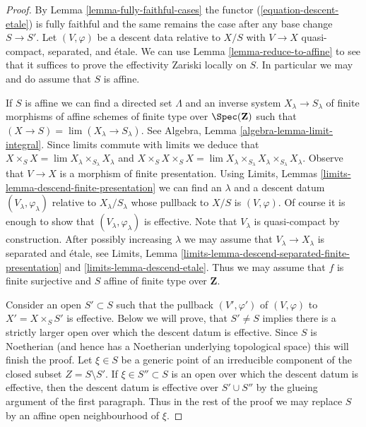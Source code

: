\begin{proof}
By Lemma \ref{lemma-fully-faithful-cases} the
functor (\ref{equation-descent-etale})
is fully faithful and the same remains the case after any
base change $S \to S'$. Let $(V, \varphi)$ be a descent data
relative to $X/S$ with $V \to X$ quasi-compact, separated, and \'etale.
We can use Lemma \ref{lemma-reduce-to-affine}
to see that it suffices to prove the effectivity 
Zariski locally on $S$. In particular we may and do
assume that $S$ is affine.

\medskip\noindent
If $S$ is affine we can find a directed set $\Lambda$ and
an inverse system $X_\lambda \to S_\lambda$
of finite morphisms of affine schemes of finite type over
$\Spec(\mathbf{Z})$ such that $(X \to S) = \lim (X_\lambda \to S_\lambda)$.
See Algebra, Lemma \ref{algebra-lemma-limit-integral}.
Since limits commute with limits we deduce that
$X \times_S X = \lim X_\lambda \times_{S_\lambda} X_\lambda$
and 
$X \times_S X \times_S X = \lim
X_\lambda \times_{S_\lambda} X_\lambda \times_{S_\lambda} X_\lambda$.
Observe that $V \to X$ is a morphism of finite presentation.
Using Limits, Lemmas \ref{limits-lemma-descend-finite-presentation}
we can find an $\lambda$ and a descent datum $(V_\lambda, \varphi_\lambda)$
relative to $X_\lambda/S_\lambda$ whose pullback to $X/S$ is
$(V, \varphi)$. Of course it is enough to show that
$(V_\lambda, \varphi_\lambda)$ is effective. Note that $V_\lambda$
is quasi-compact by construction.
After possibly increasing $\lambda$ we may assume
that $V_\lambda \to X_\lambda$ is separated and \'etale, see
Limits, Lemma \ref{limits-lemma-descend-separated-finite-presentation} and
\ref{limits-lemma-descend-etale}.
Thus we may assume that $f$ is finite surjective and
$S$ affine of finite type over $\mathbf{Z}$.

\medskip\noindent
Consider an open $S' \subset S$ such that the pullback $(V', \varphi')$
of $(V, \varphi)$ to $X' = X \times_S S'$ is effective. Below we will
prove, that $S' \not = S$ implies there is a strictly larger open over
which the descent datum is effective. Since $S$ is Noetherian (and hence
has a Noetherian underlying topological space) this will finish the proof.
Let $\xi \in S$ be a generic point of an irreducible component of the
closed subset $Z = S \setminus S'$.
If $\xi \in S'' \subset S$ is an open over which the descent datum is
effective, then the descent datum is effective over
$S' \cup S''$ by the glueing argument of the first paragraph. Thus
in the rest of the proof we may replace $S$ by an affine open
neighbourhood of $\xi$.


\end{proof}
